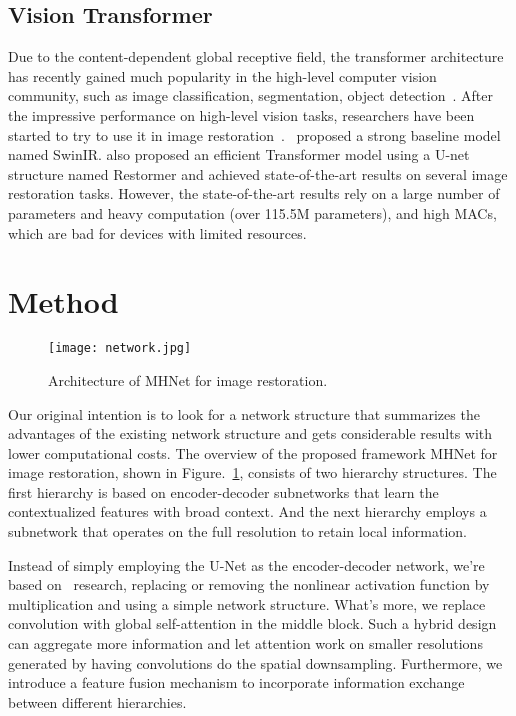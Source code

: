 \documentclass[lettersize,journal]{IEEEtran}
\begin{document}
\subsection{Vision Transformer}
Due to the content-dependent global receptive field, the transformer architecture~\cite{2017Attention} has recently gained much popularity in the high-level computer vision community, such as image classification, segmentation, object detection~\cite{Conde_2021_CVPR,dosovitskiy2020vit,liu2021swin,chen2021outperform}. After the impressive performance on high-level vision tasks, researchers have been started to try to use it in image restoration~\cite{conde2022swin2sr,liang2021swinir,Zamir2021Restormer,Tsai2022Stripformer,Wang_2022_CVPR, DRSformer, kong2023efficient, IDT}.~\cite{liang2021swinir} proposed a strong baseline model named SwinIR. \cite{Zamir2021Restormer} also proposed an efficient Transformer model using a U-net structure named Restormer and achieved state-of-the-art results on several image restoration tasks. However, the state-of-the-art results rely on a large number of parameters and heavy computation (over 115.5M parameters), and high MACs, which are bad for devices with limited resources. 

\section{Method}
\begin{figure}[htb] \centering
	\texttt{[image: network.jpg]}
	\caption{Architecture of MHNet for image restoration.
}
	\label{fig:network}
\end{figure}
Our original intention is to look for a network structure that summarizes the advantages of the existing network structure and gets considerable results with lower computational costs. The overview of the proposed framework MHNet for image restoration, shown in Figure.~\ref{fig:network}, consists of two hierarchy structures. The first hierarchy is based on encoder-decoder subnetworks that learn the contextualized features with broad context.  And the next hierarchy employs a subnetwork that operates on the full resolution to retain local information.

Instead of simply employing the U-Net as the encoder-decoder network, we're based on~\cite{chen2022simple} research, replacing or removing the nonlinear activation function by multiplication and using a simple network structure. What's more, we replace convolution with global self-attention in the middle block. Such a hybrid design can aggregate more information and let attention work on smaller resolutions generated by having convolutions do the spatial downsampling. Furthermore, we introduce a feature fusion mechanism to incorporate information exchange between different hierarchies.
\end{document}
